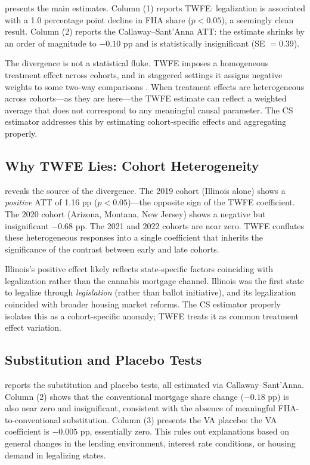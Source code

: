 \documentclass[12pt]{article}
\begin{document}
 presents the main estimates. Column (1) reports TWFE: legalization is associated with a 1.0 percentage point decline in FHA share ($p < 0.05$), a seemingly clean result. Column (2) reports the Callaway--Sant'Anna ATT: the estimate shrinks by an order of magnitude to $-0.10$ pp and is statistically insignificant (SE $= 0.39$).



The divergence is not a statistical fluke. TWFE imposes a homogeneous treatment effect across cohorts, and in staggered settings it assigns negative weights to some two-way comparisons \citep{goodman-bacon2021}. When treatment effects are heterogeneous across cohorts---as they are here---the TWFE estimate can reflect a weighted average that does not correspond to any meaningful causal parameter. The CS estimator addresses this by estimating cohort-specific effects and aggregating properly.

\subsection{Why TWFE Lies: Cohort Heterogeneity}

 reveals the source of the divergence. The 2019 cohort (Illinois alone) shows a \textit{positive} ATT of 1.16 pp ($p < 0.05$)---the opposite sign of the TWFE coefficient. The 2020 cohort (Arizona, Montana, New Jersey) shows a negative but insignificant $-0.68$ pp. The 2021 and 2022 cohorts are near zero. TWFE conflates these heterogeneous responses into a single coefficient that inherits the significance of the contrast between early and late cohorts.



Illinois's positive effect likely reflects state-specific factors coinciding with legalization rather than the cannabis mortgage channel. Illinois was the first state to legalize through \textit{legislation} (rather than ballot initiative), and its legalization coincided with broader housing market reforms. The CS estimator properly isolates this as a cohort-specific anomaly; TWFE treats it as common treatment effect variation.

\subsection{Substitution and Placebo Tests}

 reports the substitution and placebo tests, all estimated via Callaway--Sant'Anna. Column (2) shows that the conventional mortgage share change ($-0.18$ pp) is also near zero and insignificant, consistent with the absence of meaningful FHA-to-conventional substitution. Column (3) presents the VA placebo: the VA coefficient is $-0.005$ pp, essentially zero. This rules out explanations based on general changes in the lending environment, interest rate conditions, or housing demand in legalizing states.
\end{document}

